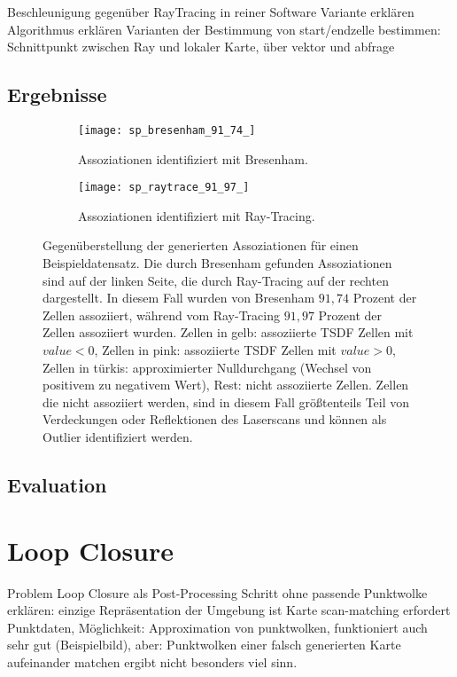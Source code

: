 Beschleunigung gegenüber RayTracing in reiner Software Variante erklären
Algorithmus erklären
Varianten der Bestimmung von start/endzelle bestimmen: Schnittpunkt zwischen Ray und lokaler Karte, über vektor und abfrage

\subsection{Ergebnisse}
\label{section:association_results}

\begin{figure}
	\centering
	\begin{subfigure}{.5\textwidth}
 		 \centering
  		 \texttt{[image: sp\_bresenham\_91\_74\_]}
  		 \centering \caption{Assoziationen identifiziert mit Bresenham.}
  		 \label{fig:sp_bresenham}
	\end{subfigure}%
	\begin{subfigure}{.5\textwidth}
    	\centering
  		\texttt{[image: sp\_raytrace\_91\_97\_]}
  		\centering \caption{Assoziationen identifiziert mit Ray-Tracing.}
  		\label{fig:sp_raytrace}
	\end{subfigure}
	\caption{Gegenüberstellung der generierten Assoziationen für einen Beispieldatensatz. Die durch Bresenham gefunden Assoziationen sind auf der linken Seite, die durch Ray-Tracing auf der rechten dargestellt. In diesem Fall wurden von Bresenham $91,74$ Prozent der Zellen assoziiert, während vom Ray-Tracing $91,97$ Prozent der Zellen assoziiert wurden. Zellen in gelb: assoziierte TSDF Zellen mit $value < 0$, Zellen in pink: assoziierte TSDF Zellen mit $value > 0$, Zellen in türkis: approximierter Nulldurchgang (Wechsel von positivem zu negativem Wert), Rest: nicht assoziierte Zellen. Zellen die nicht assoziiert werden, sind in diesem Fall größtenteils Teil von Verdeckungen oder Reflektionen des Laserscans und können als Outlier identifiziert werden.}
	\label{fig:bresenham_vs_raytrace}
\end{figure}

\subsection{Evaluation}
\label{section:association_evaluation}


\section{Loop Closure}

Problem Loop Closure als Post-Processing Schritt ohne passende Punktwolke erklären:
einzige Repräsentation der Umgebung ist Karte
scan-matching erfordert Punktdaten, Möglichkeit: Approximation von punktwolken, funktioniert auch sehr gut (Beispielbild), aber: Punktwolken einer falsch generierten Karte aufeinander matchen ergibt nicht besonders viel sinn.

